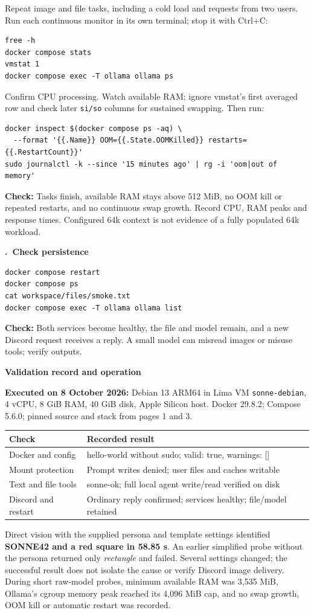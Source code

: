 \documentclass[10pt,a4paper]{article}
\newcounter{step}
\newcommand{\step}[1]{\refstepcounter{step}\vspace{3pt}\par
  {\large\bfseries\color{ink}\thestep.\ #1}\par\vspace{1pt}}
\newcommand{\checkpoint}[1]{\textbf{Check:} #1\par}
\newcommand{\pageheading}[1]{{\Large\bfseries\color{ink}#1}\par\vspace{3pt}}
\begin{document}
Repeat image and file tasks, including a cold load and requests from two users.
Run each continuous monitor in its own terminal; stop it with Ctrl+C:
\begin{lstlisting}
free -h
docker compose stats
vmstat 1
docker compose exec -T ollama ollama ps
\end{lstlisting}
Confirm CPU processing. Watch available RAM; ignore vmstat's first averaged row
and check later \texttt{si/so} columns for sustained swapping. Then run:
\begin{lstlisting}
docker inspect $(docker compose ps -aq) \
  --format '{{.Name}} OOM={{.State.OOMKilled}} restarts={{.RestartCount}}'
sudo journalctl -k --since '15 minutes ago' | rg -i 'oom|out of memory'
\end{lstlisting}
\checkpoint{Tasks finish, available RAM stays above 512 MiB, no OOM kill or repeated
restarts, and no continuous swap growth. Record CPU, RAM peaks and response times.
Configured 64k context is not evidence of a fully populated 64k workload.}

\step{Check persistence}
\begin{lstlisting}
docker compose restart
docker compose ps
cat workspace/files/smoke.txt
docker compose exec -T ollama ollama list
\end{lstlisting}
\checkpoint{Both services become healthy, the file and model remain, and a new Discord
request receives a reply. A small model can misread images or misuse tools; verify outputs.}

\newpage
\pageheading{Validation record and operation}
\textbf{Executed on 8 October 2026:} Debian 13 ARM64 in Lima VM
\texttt{sonne-debian}, 4 vCPU, 8 GiB RAM, 40 GiB disk, Apple Silicon host.
Docker 29.8.2; Compose 5.6.0; pinned source and stack from pages 1 and 3.
\begin{tabularx}{\linewidth}{@{}lX@{}}\toprule
Check & Recorded result \\\midrule
Docker and config & hello-world without sudo; valid: true, warnings: [] \\
Mount protection & Prompt writes denied; user files and caches writable \\
Text and file tools & sonne-ok; full local agent write/read verified on disk \\
Discord and restart & Ordinary reply confirmed; services healthy; file/model retained \\
\bottomrule\end{tabularx}

Direct vision with the supplied persona and template settings identified
\textbf{SONNE42 and a red square in 58.85 s}. An earlier simplified probe without
the persona returned only \emph{rectangle} and failed. Several settings changed;
the successful result does not isolate the cause or verify Discord image delivery.
During short raw-model probes, minimum available RAM was 3,535 MiB,
Ollama's cgroup memory peak reached its 4,096 MiB cap, and no swap growth,
OOM kill or automatic restart was recorded.
\end{document}
